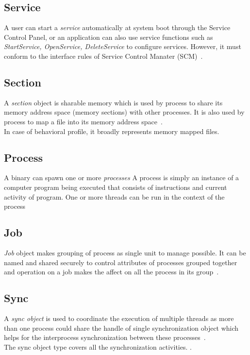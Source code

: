 \subsection{Service}
\label{sub:Service}
A user can start a \emph{service} automatically at system boot through the Service Control Panel, or an application can also use service functions such as \emph{StartService, OpenService, DeleteService} to configure services.
However, it must conform to the interface rules of Service Control Manater (SCM)~\cite[]{msservice}.
\subsection{Section}
\label{sub:Section}
A \emph{section} object is sharable memory which is used by process to share its memory address space (memory sections) with other processes.
It is also used by process to map a file into its memory address space~\cite[]{mssection}.\\
In case of behavioral profile, it broadly represents memory mapped files.
\subsection{Process}
\label{sub:Process}
A binary can spawn one or more \emph{processes}
A process is simply an instance of a computer program being executed that consists of instructions and current activity of program.
One or more threads can be run in the context of the process~\cite[]{msprocess} 
\subsection{Job}
\label{sub:Job}
\emph{Job} object makes grouping of process as single unit  to manage possible.
It can be named and shared securely to control attributes of processes grouped together and operation on a job makes the affect on all the process in its group~\cite[]{msjob}.
\subsection{Sync}
\label{sub:Sync}
A \emph{sync object} is used to coordinate the execution of multiple threads as more than one process could share the handle of single synchronization object which helps for the interprocess synchronization between these processes~\cite[]{mssync}.\\
The sync object type covers all the synchronization activities.
\cite[]{mssync}.
